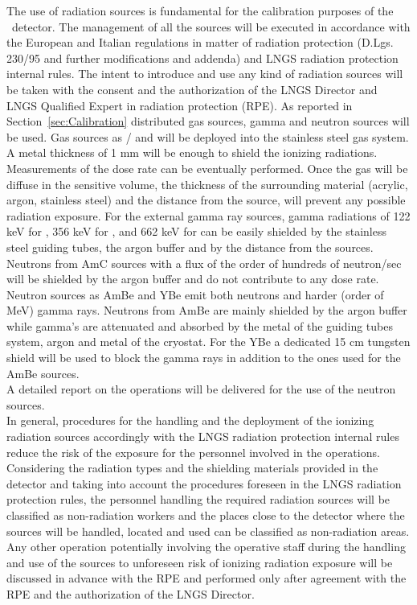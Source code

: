 The use of radiation sources is fundamental for the calibration purposes of the \DSks\ detector.
The management of all the sources will be executed in accordance with the European and Italian regulations in matter of radiation protection (D.Lgs. 230/95 and further modifications and addenda) and LNGS radiation protection internal rules.
The intent to introduce and use any kind of radiation sources will be taken with the consent and the authorization of the LNGS Director and LNGS Qualified Expert in radiation protection (RPE).
As reported in Section~\ref{sec:Calibration} distributed gas sources, gamma and neutron sources will be used.
Gas sources as / and  will be deployed into the stainless steel gas system. A metal thickness of 1 mm will be enough to shield the ionizing radiations. Measurements of the dose rate can be eventually performed. Once the gas will be diffuse in the sensitive volume, the thickness of the surrounding material (acrylic, argon, stainless steel) and the distance from the source, will prevent any possible radiation exposure.
For the external gamma ray sources, gamma radiations of 122 keV for , 356 keV for , and 662 keV for  can be easily shielded by the stainless steel guiding tubes, the argon buffer and by the distance from the sources.
Neutrons from AmC sources with a flux of the order of hundreds of neutron/sec will be shielded by the argon buffer and do not contribute to any dose rate.
Neutron sources as AmBe and YBe emit both neutrons and harder (order of MeV) gamma rays. Neutrons from AmBe are mainly shielded by the argon buffer while gamma's are attenuated and absorbed by the metal of the guiding tubes system, argon and metal of the cryostat. For the YBe a dedicated 15 cm tungsten shield will be used to block the gamma rays in addition to the ones used for the AmBe sources.\\
A detailed report on the operations will be delivered for the use of the neutron sources.\\
In general, procedures for the handling and the deployment of the ionizing radiation sources accordingly with the LNGS radiation protection internal rules reduce the risk of the exposure for the personnel involved in the operations. 
Considering the radiation types and the shielding materials provided in the detector and taking into account the procedures foreseen in the LNGS radiation protection rules, the personnel handling the required radiation sources will be classified as non-radiation workers and the places close to the detector where the sources will be handled, located and used can be classified as non-radiation areas.
Any other operation potentially involving the operative staff during the handling and use of the sources to unforeseen risk of ionizing radiation exposure will be discussed in advance with the RPE and performed only after agreement with the RPE and the authorization of the LNGS Director.






